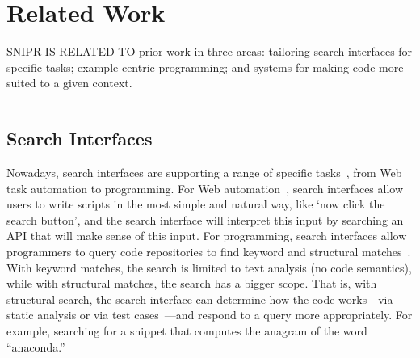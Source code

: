 \chapter{Related Work}{}
\label{sec:related}

\lettrine[lraise=0.1, nindent=0em, slope=-.5em]{S} {NIPR IS RELATED TO} prior work in three areas: tailoring search interfaces for specific tasks; example-centric programming; and systems for making code more suited to a given context.

\fancybreak{\pfbreakdisplay}

\section{Search Interfaces}
\label{sec:searchengines}

Nowadays, search interfaces are supporting a range of specific tasks~\cite{Brandt:2009jb, Morville:2010up, Wightman:2012gc}, from Web task automation to programming. For Web automation~\cite{Little:2007dh, Miller:2008ge, Cypher:2010ub}, search interfaces allow users to write scripts in the most simple and natural way, like `now click the search button', and the search interface will interpret this input by searching an API that will make sense of this input. For programming, search interfaces allow programmers to query code repositories to find keyword and structural matches~\cite{Mandelin:2005uj, Bajracharya:2006vn, Sahavechaphan:2006tc, Bajracharya:2010um}. With keyword matches, the search is limited to text analysis (no code semantics), while with structural matches, the search has a bigger scope. That is, with structural search, the search interface can determine how the code works---via static analysis or via test cases~\cite{Hummel:eq, LazzariniLemos:2007jh, Reiss:2009fu}---and respond to a query more appropriately. For example, searching for a snippet that computes the anagram of the word ``anaconda.'' 

